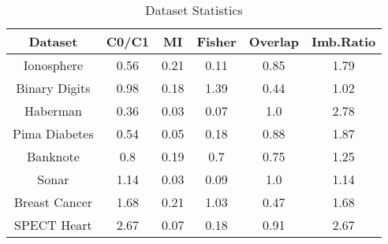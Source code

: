 \begin{table}[htbp]
\caption{Dataset Statistics}
\begin{center}
\begin{tabular}{|c|c|c|c|c|c|}
\hline
\textbf{Dataset} & \textbf{C0/C1} & \textbf{MI} & \textbf{Fisher} & \textbf{Overlap} & \textbf{Imb.Ratio} \\ \hline
Ionosphere & 0.56 & 0.21 & 0.11 & 0.85 & 1.79 \\ \hline
Binary Digits & 0.98 & 0.18 & 1.39 & 0.44 & 1.02 \\ \hline
Haberman & 0.36 & 0.03 & 0.07 & 1.0 & 2.78 \\ \hline
Pima Diabetes & 0.54 & 0.05 & 0.18 & 0.88 & 1.87 \\ \hline
Banknote & 0.8 & 0.19 & 0.7 & 0.75 & 1.25 \\ \hline
Sonar & 1.14 & 0.03 & 0.09 & 1.0 & 1.14 \\ \hline
Breast Cancer & 1.68 & 0.21 & 1.03 & 0.47 & 1.68 \\ \hline
SPECT Heart & 2.67 & 0.07 & 0.18 & 0.91 & 2.67 \\ \hline
\end{tabular}
\label{tab:statistics}
\end{center}
\end{table}